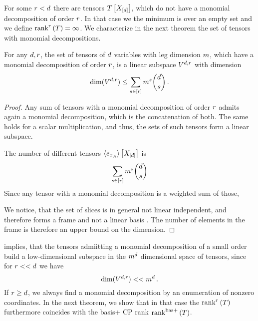 For some $r<d$ there are tensors $T\left[X_{[d]}\right]$, which do not have a monomial decomposition of order $r$.
In that case we the minimum is over an empty set and we define $\mathrm{rank}^{r}\left(T\right)=\infty$.
We characterize in the next theorem the set of tensors with monomial decompositions.


\begin{theorem}\label{the:polynomialSubspaces}
	For any $d, r$, the set of tensors of $d$ variables with leg dimension $m$, which have a monomial decomposition of order $r$, is a linear subspace $V^{d,r}$ with dimension
		\[ \mathrm{dim}(V^{d,r}) \leq  \sum_{s \in [r]} m^s \binom{d}{s} \, .  \]
\end{theorem}
\begin{proof}
	Any sum of tensors with a monomial decomposition of order $r$ admits again a monomial decomposition, which is the concatenation of both.
	The same holds for a scalar multiplication, and thus, the sets of such tensors form a linear subspace.

	The number of different tensors $\left\langle e_{x_{A}}\right\rangle \left[ X_{[d]} \right]$ is
		\[  \sum_{s \in [r]} m^s \binom{d}{s}  \]
	Since any tensor with a monomial decomposition is a weighted sum of those, 
	
	We notice, that the set of slices is in general not linear independent, and therefore forms a frame and not a linear basis \cite{casazza_introduction_2013}.
	The number of elements in the frame is therefore an upper bound on the dimension.
\end{proof}


 implies, that the tensors admiitting a monomial decomposition of a small order build a low-dimensional subspace in the $m^d$ dimensional space of tensors, since for $r << d $ we have
	\[ \mathrm{dim}(V^{d,r}) << m^{d} \, . \]
If $r\geq d$, we always find a monomial decomposition by an enumeration of nonzero coordinates.
In the next theorem, we show that in that case the $\mathrm{rank}^{r}\left(T\right)$ furthermore coincides with the basis+ CP rank $\mathrm{rank}^{\mathrm{bas+}}\left(T\right)$.

